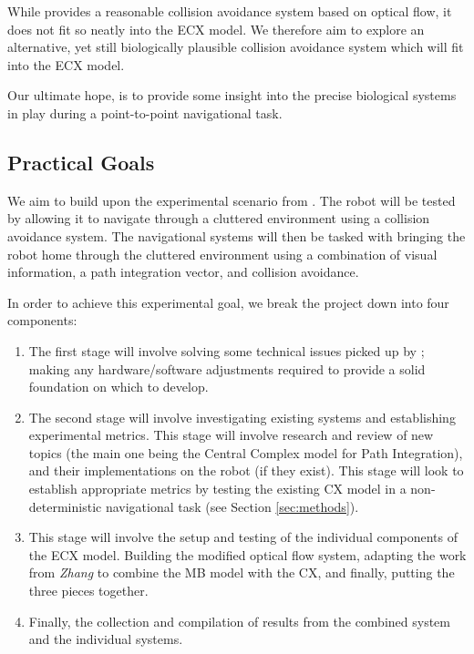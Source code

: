 \documentclass[a4paper,11pt,twoside,openright]{article}
\begin{document}
While \cite{Mitchell2018} provides a reasonable collision avoidance system
based on optical flow, it does not fit so neatly into the ECX model. We therefore
aim to explore an alternative, yet still biologically plausible collision
avoidance system which will fit into the ECX model.
\newline
\par

Our ultimate hope, is to provide some insight into the precise biological
systems in play during a point-to-point navigational task.

\subsection { Practical Goals }
We aim to build upon the experimental scenario from \cite{Mitchell2018}. The
robot will be tested by allowing it to navigate through a cluttered environment
using a collision avoidance system. The navigational systems will then be
tasked with bringing the robot home through the cluttered environment using
a combination of visual information, a path integration vector, and
collision avoidance.
\newline
\par

In order to achieve this experimental goal, we break the project down
into four components:

\begin{enumerate}
\item{The first stage will involve solving some technical issues
  picked up by \cite{Mitchell2018}; making any hardware/software adjustments
  required to provide a solid foundation on which to develop.}

\item{ The second stage
will involve investigating existing systems and establishing experimental
metrics. This stage will involve research and review of new topics (the
main one being the Central Complex model for Path Integration), and their
implementations on the robot (if they exist). This stage will look to establish
appropriate metrics by testing the existing CX model in a non-deterministic
navigational task (see Section \ref{sec:methods}).}

\item{This stage will involve the setup and testing of the individual components
  of the ECX model. Building the modified optical flow system, adapting the work
  from \textit{Zhang} to combine the MB model with the CX, and finally, putting
  the three pieces together.}

\item{Finally, the collection and compilation of results from the combined system
and the individual systems.}
\end{enumerate}
\end{document}

